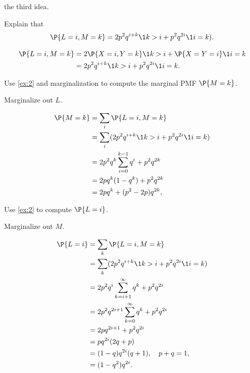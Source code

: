 \documentclass[a4paper]{article}
\begin{document}
 the third idea.

\begin{exercise}
Explain that
\begin{equation*}
\P{L=i, M=k} = 2p^{2}q^{i+k}\1{k>i}+ p^{2}q^{2i}\1{i=k}).
\end{equation*}
\begin{solution}
  \begin{align*}
\P{L=i, M=k}
&= 2\P{X=i, Y=k}\1{k>i} + \P{X=Y=i}\1{i=k} \\
&= 2p^{2}q^{i+k}\1{k>i}+ p^{2}q^{2i}\1{i=k}.
  \end{align*}
\end{solution}
\label{ex:2}
\end{exercise}


\begin{exercise}
Use \cref{ex:2} and marginalization to compute the marginal PMF \(\P{M=k}\).
\begin{hint}
Marginalize out \(L\).
\end{hint}
\begin{solution}
  \begin{align*}
\P{M=k}
&= \sum_{i} \P{L=i, M=k} \\
 &= \sum_{i} (2p^{2}q^{i+k}\1{k>i}+ p^{2}q^{2i}\1{i=k}) \\
 &= 2p^2q^k\sum_{i=0}^{k-1} q^{i}+ p^{2}q^{2k} \\
 &= 2pq^k (1-q^{k})+ p^{2}q^{2k} \\
 &= 2pq^k + (p^{2}-2p) q^{2k},
  \end{align*}
\end{solution}
\end{exercise}

\begin{exercise}
Use \cref{ex:2} to compute \(\P{L=i}\).
\begin{hint}
Marginalize out \(M\).
\end{hint}
\begin{solution}
  \begin{align*}
\P{L=i}
&= \sum_{k} \P{L=i, M=k} \\
 &= \sum_{k} (2p^{2}q^{i+k}\1{k>i}+ p^{2}q^{2i}\1{i=k}) \\
 &= 2p^2q^i\sum_{k=i+1}^{\infty} q^{k}+ p^{2}q^{2i} \\
 &= 2p^{2}q^{2i+1} \sum_{k=0}^{\infty}q^{k}+ p^{2}q^{2i} \\
 &= 2pq^{2i+1} + p^{2} q^{2i}\\
 &= pq^{2i}(2q+p)\\
 &= (1-q)q^{2i}(q + 1), \quad p+q=1,\\
 &= (1-q^{2})q^{2i}.
  \end{align*}
\end{solution}
\end{exercise}
\end{document}

